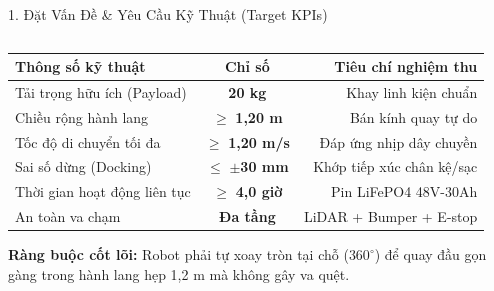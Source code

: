 \documentclass[aspectratio=169,9pt]{beamer}
\begin{document}
\begin{frame}{1. Đặt Vấn Đề \& Yêu Cầu Kỹ Thuật (Target KPIs)}
\begin{columns}[T,onlytextwidth]
    \begin{column}{0.49\textwidth}
      \begin{tcolorbox}[titlepanel,title=Chỉ số kỹ thuật yêu cầu (KPIs)]
        {\fontsize{7.2}{8.5}\selectfont
        \begin{tabularx}{\linewidth}{@{}Ycr@{}}
          \toprule
          \textbf{Thông số kỹ thuật} & \textbf{Chỉ số} & \textbf{Tiêu chí nghiệm thu} \\
          \midrule
          Tải trọng hữu ích (Payload) & \textbf{20 kg} & Khay linh kiện chuẩn \\
          Chiều rộng hành lang & $\ge$ \textbf{1,20 m} & Bán kính quay tự do \\
          Tốc độ di chuyển tối đa & $\ge$ \textbf{1,20 m/s} & Đáp ứng nhịp dây chuyền \\
          Sai số dừng (Docking) & $\le$ \textbf{$\pm$30 mm} & Khớp tiếp xúc chân kệ/sạc \\
          Thời gian hoạt động liên tục & $\ge$ \textbf{4,0 giờ} & Pin LiFePO4 48V-30Ah \\
          An toàn va chạm & \textbf{Đa tầng} & LiDAR + Bumper + E-stop \\
          \bottomrule
        \end{tabularx}}
      \end{tcolorbox}
      \vspace{0.12cm}
      \begin{tcolorbox}[keypanel]
        \centering\fontsize{7.6}{9.0}\selectfont
        \textbf{Ràng buộc cốt lõi:} Robot phải tự xoay tròn tại chỗ ($360^\circ$) để quay đầu gọn gàng trong hành lang hẹp 1,2 m mà không gây va quệt.
      \end{tcolorbox}
    \end{column}
  \end{columns}
\end{frame}
\end{document}

